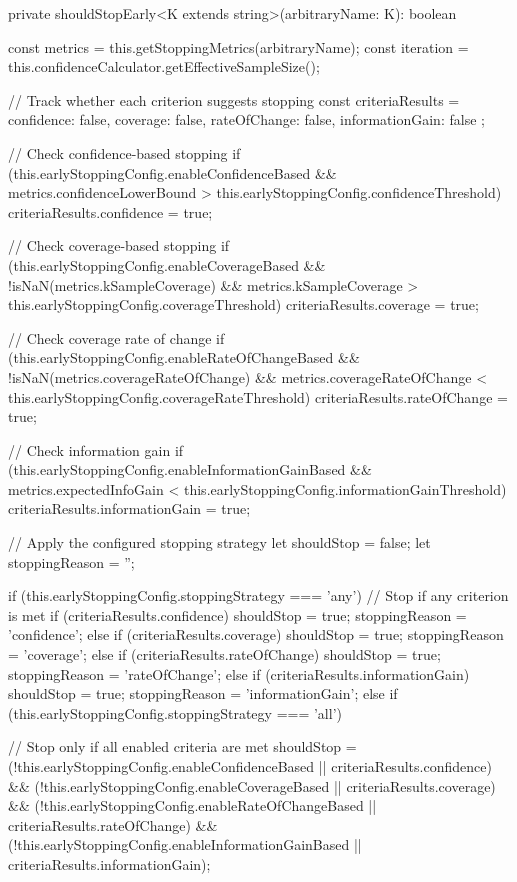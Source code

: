 \documentclass[11pt,a4paper]{article}
\begin{document}
\begin{wrappedcode}
    private shouldStopEarly<K extends string>(arbitraryName: K): boolean {
      const metrics = this.getStoppingMetrics(arbitraryName);
      const iteration = this.confidenceCalculator.getEffectiveSampleSize();
      
      // Track whether each criterion suggests stopping
      const criteriaResults = {
        confidence: false,
        coverage: false,
        rateOfChange: false,
        informationGain: false
      };
      
      // Check confidence-based stopping
      if (this.earlyStoppingConfig.enableConfidenceBased \&\&
          metrics.confidenceLowerBound > this.earlyStoppingConfig.confidenceThreshold) {
        criteriaResults.confidence = true;
      }
      
      // Check coverage-based stopping
      if (this.earlyStoppingConfig.enableCoverageBased \&\&
          !isNaN(metrics.kSampleCoverage) \&\&
          metrics.kSampleCoverage > this.earlyStoppingConfig.coverageThreshold) {
        criteriaResults.coverage = true;
      }
      
      // Check coverage rate of change
      if (this.earlyStoppingConfig.enableRateOfChangeBased && 
          !isNaN(metrics.coverageRateOfChange) && 
          metrics.coverageRateOfChange < this.earlyStoppingConfig.coverageRateThreshold) {
        criteriaResults.rateOfChange = true;
      }
      
      // Check information gain
      if (this.earlyStoppingConfig.enableInformationGainBased && 
          metrics.expectedInfoGain < this.earlyStoppingConfig.informationGainThreshold) {
        criteriaResults.informationGain = true;
      }

      // Apply the configured stopping strategy
      let shouldStop = false;
      let stoppingReason = '';
      
      if (this.earlyStoppingConfig.stoppingStrategy === 'any') {
        // Stop if any criterion is met
        if (criteriaResults.confidence) {
          shouldStop = true;
          stoppingReason = 'confidence';
        } else if (criteriaResults.coverage) {
          shouldStop = true;
          stoppingReason = 'coverage';
        } else if (criteriaResults.rateOfChange) {
          shouldStop = true;
          stoppingReason = 'rateOfChange';
        } else if (criteriaResults.informationGain) {
          shouldStop = true;
          stoppingReason = 'informationGain';
        }
      } else if (this.earlyStoppingConfig.stoppingStrategy === 'all') {
        // Stop only if all enabled criteria are met
        shouldStop = 
          (!this.earlyStoppingConfig.enableConfidenceBased || criteriaResults.confidence) &&
          (!this.earlyStoppingConfig.enableCoverageBased || criteriaResults.coverage) &&
          (!this.earlyStoppingConfig.enableRateOfChangeBased || criteriaResults.rateOfChange) &&
          (!this.earlyStoppingConfig.enableInformationGainBased || criteriaResults.informationGain);
        
}}
\end{wrappedcode}
\end{document}
